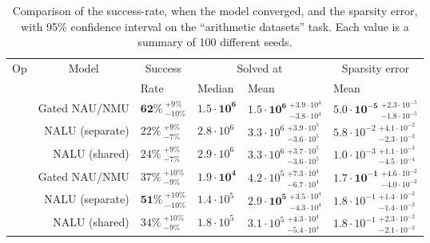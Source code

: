 \begin{table}[!h]

\caption{\label{tab:simple-function-static-nalu-gate-table}Comparison of the success-rate, when the model converged, and the sparsity error, with 95\% confidence interval on the ``arithmetic datasets'' task. Each value is a summary of 100 different seeds.}
\centering
\begin{tabular}{crllll}
\toprule
\multicolumn{1}{c}{Op} & \multicolumn{1}{c}{Model} & \multicolumn{1}{c}{Success} & \multicolumn{2}{c}{Solved at} & \multicolumn{1}{c}{Sparsity error} \\
\cmidrule(l{3pt}r{3pt}){1-1} \cmidrule(l{3pt}r{3pt}){2-2} \cmidrule(l{3pt}r{3pt}){3-3} \cmidrule(l{3pt}r{3pt}){4-5} \cmidrule(l{3pt}r{3pt}){6-6}
 &  & Rate & Median & Mean & Mean\\
\midrule
 & Gated NAU/NMU & $\mathbf{62\%} {~}^{+9\%}_{-10\%}$ & $\mathbf{1.5 \cdot 10^{6}}$ & $\mathbf{1.5 \cdot 10^{6}} {~}^{+3.9 \cdot 10^{4}}_{-3.8 \cdot 10^{4}}$ & $\mathbf{5.0 \cdot 10^{-5}} {~}^{+2.3 \cdot 10^{-5}}_{-1.8 \cdot 10^{-5}}$\\

\nopagebreak
 & NALU (separate) & $22\% {~}^{+9\%}_{-7\%}$ & $2.8 \cdot 10^{6}$ & $3.3 \cdot 10^{6} {~}^{+3.9 \cdot 10^{5}}_{-3.6 \cdot 10^{5}}$ & $5.8 \cdot 10^{-2} {~}^{+4.1 \cdot 10^{-2}}_{-2.3 \cdot 10^{-2}}$\\

\nopagebreak
\multirow{-3}{*}{\centering\arraybackslash $\bm{\times}$} & NALU (shared) & $24\% {~}^{+9\%}_{-7\%}$ & $2.9 \cdot 10^{6}$ & $3.3 \cdot 10^{6} {~}^{+3.7 \cdot 10^{5}}_{-3.6 \cdot 10^{5}}$ & $1.0 \cdot 10^{-3} {~}^{+1.1 \cdot 10^{-3}}_{-4.5 \cdot 10^{-4}}$\\
\cmidrule{1-6}
 & Gated NAU/NMU & $37\% {~}^{+10\%}_{-9\%}$ & $\mathbf{1.9 \cdot 10^{4}}$ & $4.2 \cdot 10^{5} {~}^{+7.3 \cdot 10^{4}}_{-6.7 \cdot 10^{4}}$ & $\mathbf{1.7 \cdot 10^{-1}} {~}^{+4.6 \cdot 10^{-2}}_{-4.0 \cdot 10^{-2}}$\\

\nopagebreak
 & NALU (separate) & $\mathbf{51\%} {~}^{+10\%}_{-10\%}$ & $1.4 \cdot 10^{5}$ & $\mathbf{2.9 \cdot 10^{5}} {~}^{+3.5 \cdot 10^{4}}_{-4.3 \cdot 10^{4}}$ & $1.8 \cdot 10^{-1} {~}^{+1.4 \cdot 10^{-2}}_{-1.4 \cdot 10^{-2}}$\\

\nopagebreak
\multirow{-3}{*}{\centering\arraybackslash $\bm{+}$} & NALU (shared) & $34\% {~}^{+10\%}_{-9\%}$ & $1.8 \cdot 10^{5}$ & $3.1 \cdot 10^{5} {~}^{+4.3 \cdot 10^{4}}_{-5.4 \cdot 10^{4}}$ & $1.8 \cdot 10^{-1} {~}^{+2.3 \cdot 10^{-2}}_{-2.1 \cdot 10^{-2}}$\\
\bottomrule
\end{tabular}
\end{table}
